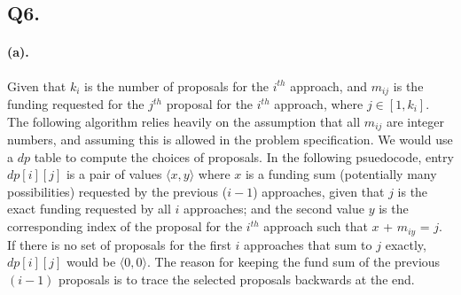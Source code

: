 \documentclass[12pt]{article}
\begin{document}
\subsection*{Q6.}
\paragraph{(a).} Given that \(k_i\) is the number of proposals for the \(i^{th}\) approach, and \(m_{ij}\) is the funding requested for the \(j^{th}\) proposal for the \(i^{th}\) approach, where \(j \in [1, k_i]\). The following algorithm relies heavily on the assumption that all \(m_{ij}\) are integer numbers, and assuming this is allowed in the problem specification. We would use a \(dp\) table to compute the choices of proposals. In the following psuedocode, entry \(dp[i][j]\) is a pair of values \(\langle x,y\rangle\) where \(x\) is a funding sum (potentially many possibilities) requested by the previous (\(i-1\)) approaches, given that \(j\) is the exact funding requested by all \(i\) approaches; and the second value \(y\) is the corresponding index of the proposal for the \(i^{th}\) approach such that \(x\) + \(m_{iy}\) = \(j\). If there is no set of proposals for the first \(i\) approaches that sum to \(j\) exactly, \(dp[i][j]\) would be \(\langle 0,0\rangle\). The reason for keeping the fund sum of the previous \((i-1)\) proposals is to trace the selected proposals backwards at the end.
\end{document}

